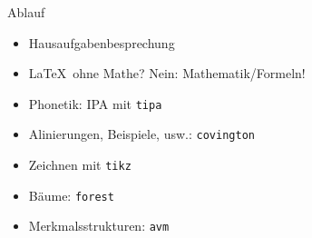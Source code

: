 \begin{frame}[fragile]{Ablauf}
    \begin{itemize}[<+->]
        \item Hausaufgabenbesprechung
        \item \LaTeX\ ohne Mathe? Nein: Mathematik/Formeln!
        \item Phonetik: IPA mit \texttt{tipa}
        \item Alinierungen, Beispiele, usw.: \texttt{covington}
        \item Zeichnen mit \texttt{tikz}
        \item Bäume: \texttt{forest}
        \item Merkmalsstrukturen: \texttt{avm}
    \end{itemize}
\end{frame}
